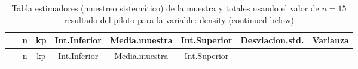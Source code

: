\documentclass[
]{article}
\begin{document}
\begin{longtable}[]{@{}cccccccc@{}}
\caption{Tabla estimadores (muestreo sistemático) de la muestra y
totales usando el valor de \(n = 15\) resultado del piloto para la
variable: density (continued below)}\tabularnewline
\toprule
\begin{minipage}[b]{0.19\columnwidth}\centering
~\strut
\end{minipage} & \begin{minipage}[b]{0.03\columnwidth}\centering
n\strut
\end{minipage} & \begin{minipage}[b]{0.04\columnwidth}\centering
kp\strut
\end{minipage} & \begin{minipage}[b]{0.10\columnwidth}\centering
Int.Inferior\strut
\end{minipage} & \begin{minipage}[b]{0.11\columnwidth}\centering
Media.muestra\strut
\end{minipage} & \begin{minipage}[b]{0.10\columnwidth}\centering
Int.Superior\strut
\end{minipage} & \begin{minipage}[b]{0.12\columnwidth}\centering
Desviacion.std.\strut
\end{minipage} & \begin{minipage}[b]{0.08\columnwidth}\centering
Varianza\strut
\end{minipage}\tabularnewline
\midrule
\endfirsthead
\toprule
\begin{minipage}[b]{0.19\columnwidth}\centering
~\strut
\end{minipage} & \begin{minipage}[b]{0.03\columnwidth}\centering
n\strut
\end{minipage} & \begin{minipage}[b]{0.04\columnwidth}\centering
kp\strut
\end{minipage} & \begin{minipage}[b]{0.10\columnwidth}\centering
Int.Inferior\strut
\end{minipage} & \begin{minipage}[b]{0.11\columnwidth}\centering
Media.muestra\strut
\end{minipage} & \begin{minipage}[b]{0.10\columnwidth}\centering
Int.Superior\strut
\end{minipage} & \begin{minipage}[b]{0.12\columnwidth}\centering

\end{minipage}
\end{longtable}
\end{document}
